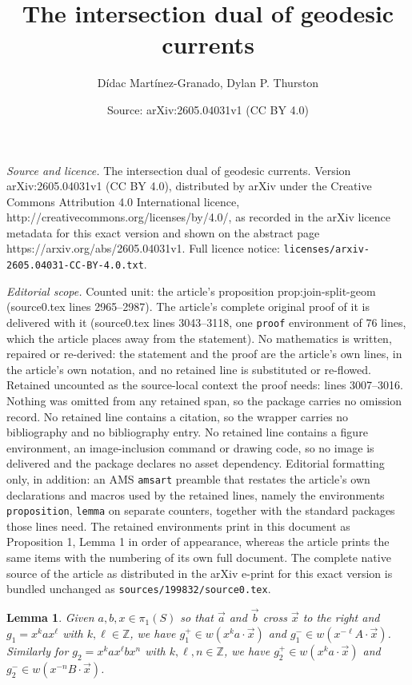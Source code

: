 \documentclass[10pt,a4paper]{amsart}
\title{The intersection dual of geodesic currents}
\author{D\'idac Mart\'inez-Granado, Dylan P. Thurston}
\date{Source: arXiv:2605.04031v1 (CC BY 4.0)}
\newtheorem{lemma}{Lemma}
\newcommand\bbZ{\ensuremath{\mathbb{Z}}}
\newcommand{\ora}[1]{\overrightarrow{#1}}
\begin{document}
\maketitle

\noindent\emph{Source and licence.} The intersection dual of geodesic currents. Version arXiv:2605.04031v1 (CC BY 4.0), distributed by arXiv under the Creative Commons Attribution 4.0 International licence, http://creativecommons.org/licenses/by/4.0/, as recorded in the arXiv licence metadata for this exact version and shown on the abstract page https://arxiv.org/abs/2605.04031v1. Full licence notice: \texttt{licenses/arxiv-2605.04031-CC-BY-4.0.txt}.\par\smallskip

\noindent\textit{Editorial scope.} Counted unit: the article's proposition prop:join-split-geom (source0.tex lines 2965--2987). The article's complete original proof of it is delivered with it (source0.tex lines 3043--3118, one \texttt{proof} environment of 76 lines, which the article places away from the statement). No mathematics is written, repaired or re-derived: the statement and the proof are the article's own lines, in the article's own notation, and no retained line is substituted or re-flowed.  Retained uncounted as the source-local context the proof needs: lines 3007--3016.  Nothing was omitted from any retained span, so the package carries no omission record.  No retained line contains a citation, so the wrapper carries no bibliography and no bibliography entry.  No retained line contains a figure environment, an image-inclusion command or drawing code, so no image is delivered and the package declares no asset dependency.  Editorial formatting only, in addition: an AMS \texttt{amsart} preamble that restates the article's own declarations and macros used by the retained lines, namely the environments \texttt{proposition}, \texttt{lemma} on separate counters, together with the standard packages those lines need.  The retained environments print in this document as Proposition 1, Lemma 1 in order of appearance, whereas the article prints the same items with the numbering of its own full document.  The complete native source of the article as distributed in the arXiv e-print for this exact version is bundled unchanged as \texttt{sources/199832/source0.tex}.
\begin{lemma}
  Given $a,b, x \in \pi_1(S)$ so that $\ora{a}$ and $\ora{b}$ cross $\ora{x}$ to
  the right and $g_1 = x^k ax^\ell$ with $k,\ell \in \bbZ$, we have
  $g_1^+ \in w(x^k a\cdot\ora{x})$ and
  $g_1^- \in w(x^{-\ell}A\cdot\ora{x})$. Similarly for
  $g_2 = x^k a x^\ell b x^n$ with $k,\ell,n\in\bbZ$, we have
  $g_2^+ \in w(x^ka \cdot \ora{x})$ and $g_2^- \in w(x^{-n} B
  \cdot\ora{x})$.
\label{lem:windows}
\end{lemma}
\end{document}
